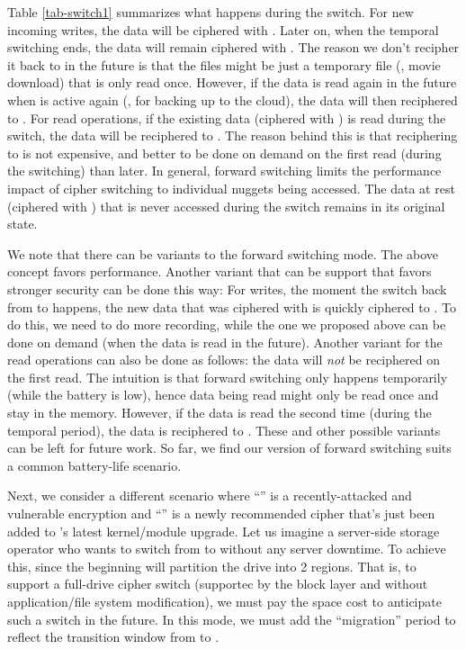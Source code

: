 Table \ref{tab-switch1} summarizes what happens during the switch.  For new
incoming writes, the data will be ciphered with \ctwo.  Later on, when the
temporal switching ends, the data will remain ciphered with \ctwo
{}.  The reason we don't recipher it back to \cone in the future
is that the files might be just a temporary file (\eg, movie download)
that is only read once.  However, if the data is read again in the future
when \cone is active again (\eg, for backing up to the cloud), the data will
then reciphered to \cone.
%
For read operations, if the existing data (ciphered with \cone) is read
during the switch, the data will be reciphered to \ctwo.  The reason behind
this is that reciphering to \ctwo is not expensive, and better to be done on
demand on the first read (during the switching) than later. 
%
In general, forward switching limits the performance impact of cipher
switching to individual nuggets being accessed.  The data at rest
(ciphered with \cone) that is never accessed during the switch remains in
its original state.



We note that there can be variants to the forward switching mode. The
above concept favors performance.  Another variant that can be support
that favors stronger security can be done this way: For writes, the moment
the switch back from \ctwo to \cone happens, the new data that was ciphered
with \ctwo is quickly ciphered to \cone.  To do this, we need to do more
recording, while the one we proposed above can be done on demand (when the
data is read in the future).
%
Another variant for the read operations can also be done as follows: the
data will {\em not} be reciphered on the first read.  The intuition is
that forward switching only happens temporarily (while the battery is
low), hence data being read might only be read once and stay in the
memory.  However, if the data is read the second time (during the temporal
period), the data is reciphered to \ctwo.
%
These and other possible variants can be left for future work.  So far, we
find our version of forward switching suits a common battery-life
scenario.





  Next, we consider a different scenario where
``\cone'' is a recently-attacked and vulnerable encryption and ``\ctwo''
is a newly recommended cipher that's just been added to \sys's latest
kernel/module upgrade.  Let us imagine a server-side storage operator who wants to switch
from \cone to \ctwo without any server downtime.  To achieve this, \sys
since the beginning will partition the drive into 2 regions.  That is, to
support a full-drive cipher switch (supportec by the block layer and
without application/file system modification), we must pay the space cost
to anticipate such a switch in the future.  In this mode, we must add the
``migration'' period to reflect the transition window from \cone to \ctwo.

